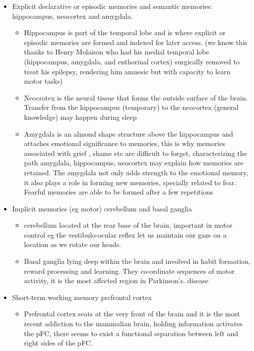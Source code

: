 \documentclass[11pt]{article}
\theoremstyle{definition}
\theoremstyle{remark}
\begin{document}
\begin{itemize}
\item Explicit declarative or episodic memories and semantic memories: hippocampus, neocortex and amygdala.
\begin{itemize}
  \item Hippocampus is part of the temporal lobe and is where explicit or episodic memories are formed and indexed for later access. (we know this thanks to Henry Molaison who had his medial temporal lobe (hippocampus, amygdala, and enthorinal cortex) surgically removed to treat his epilepsy, rendering him amnesic but with capacity to learn motor tasks)
  \item Neocrotex is the neural tissue that forms the outside surface of the brain. Transfer from the hippocampus (temporary) to the neocortex (general knowledge) may happen during sleep
  \item Amygdala is an almond shape structure above the hippocampus and attaches emotional significance to memories, this is why memories associated with grief , shame etc are difficult to forget, characterizing the path amygdala, hippocampus, neocortex may explain how memories are retained. The amygdala not only adds strength to the emotional memory, it also plays a role in forming new memories, specially related to fear. Fearful memories are able to be formed after a few repetitions
\end{itemize} 
\item Implicit memories (eg motor) cerebellum and basal ganglia
\begin{itemize}
  \item cerebellum located at the rear base of the brain, important in motor control eg the vestibulo-ocular reflex let us maintain our gaze on a location as we rotate our heads.
  \item Basal ganglia lying deep within the brain and involved in habit formation, reward processing and learning. They co-ordinate sequences of motor activity, it is the most affected region in Parkinson's. disease
\end{itemize}
\item Short-term working memory prefrontal cortex
\begin{itemize}
  \item Prefrontal cortex seats at the very front of the brain and it is the most recent addiction to the mammalian brain, holding information activates the pFC, there seems to exist a functional separation between left and right sides of the pFC.
\end{itemize}  
\end{itemize}
\end{document}
